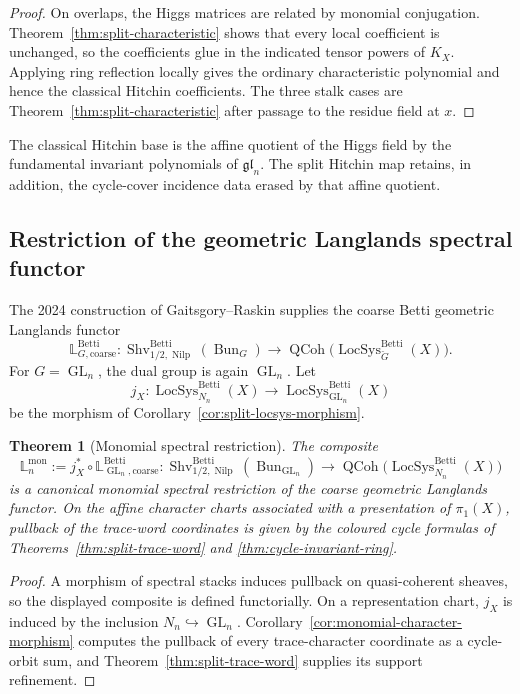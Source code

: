\documentclass[11pt]{amsart}
\numberwithin{equation}{section}
\newtheorem{theorem}{Theorem}[section]
\theoremstyle{definition}
\newcommand{\GL}{\operatorname{GL}}
\newcommand{\LocSys}{\operatorname{LocSys}}
\newcommand{\Bun}{\operatorname{Bun}}
\newcommand{\QCoh}{\operatorname{QCoh}}
\newcommand{\Nilp}{\operatorname{Nilp}}
\begin{document}
\begin{proof}
On overlaps, the Higgs matrices are related by monomial conjugation.
Theorem~\ref{thm:split-characteristic} shows that every local coefficient is
unchanged, so the coefficients glue in the indicated tensor powers of
$K_X$.  Applying ring reflection locally gives the ordinary characteristic
polynomial and hence the classical Hitchin coefficients.  The three stalk
cases are Theorem~\ref{thm:split-characteristic} after passage to the
residue field at $x$.
\end{proof}

The classical Hitchin base is the affine quotient of the Higgs field by the
fundamental invariant polynomials of $\mathfrak{gl}_n$.  The split Hitchin
map retains, in addition, the cycle-cover incidence data erased by that
affine quotient.

\subsection{Restriction of the geometric Langlands spectral functor}

The 2024 construction of Gaitsgory--Raskin supplies the coarse Betti
geometric Langlands functor
\[
\mathbb L^{\mathrm{Betti}}_{G,\mathrm{coarse}}:
\operatorname{Shv}^{\mathrm{Betti}}_{1/2,\Nilp}(\Bun_G)
\longrightarrow
\QCoh\bigl(\LocSys_{\check G}^{\mathrm{Betti}}(X)\bigr).
\]
For $G=\GL_n$, the dual group is again $\GL_n$.  Let
\[
j_X:\LocSys_{N_n}^{\mathrm{Betti}}(X)
\longrightarrow
\LocSys_{\GL_n}^{\mathrm{Betti}}(X)
\]
be the morphism of Corollary~\ref{cor:split-locsys-morphism}.

\begin{theorem}[Monomial spectral restriction]
\label{thm:monomial-langlands-restriction}
The composite
\[
\mathbb L^{\mathrm{mon}}_n
:=
j_X^*\circ\mathbb L^{\mathrm{Betti}}_{\GL_n,\mathrm{coarse}}
:
\operatorname{Shv}^{\mathrm{Betti}}_{1/2,\Nilp}(\Bun_{\GL_n})
\longrightarrow
\QCoh\bigl(\LocSys_{N_n}^{\mathrm{Betti}}(X)\bigr)
\]
is a canonical monomial spectral restriction of the coarse geometric
Langlands functor.  On the affine character charts associated with a
presentation of $\pi_1(X)$, pullback of the trace-word coordinates is given
by the coloured cycle formulas of
Theorems~\ref{thm:split-trace-word} and
\ref{thm:cycle-invariant-ring}.
\end{theorem}

\begin{proof}
A morphism of spectral stacks induces pullback on quasi-coherent sheaves, so
the displayed composite is defined functorially.  On a representation
chart, $j_X$ is induced by the inclusion $N_n\hookrightarrow\GL_n$.
Corollary~\ref{cor:monomial-character-morphism} computes the pullback of
every trace-character coordinate as a cycle-orbit sum, and
Theorem~\ref{thm:split-trace-word} supplies its support refinement.
\end{proof}
\end{document}
